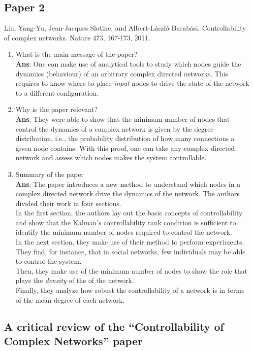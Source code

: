 \documentclass[11pt]{article}
\begin{document}
\subsection*{Paper 2}
Liu, Yang-Yu, Jean-Jacques Slotine, and Albert-László Barabási. Controllability of complex networks. Nature 473, 167-173, 2011.
\begin{enumerate}[label=(\alph*)]
	\item What is the main message of the paper? \\ \textbf{Ans}: One can make use of analytical tools to study which nodes guide the dynamics (behaviour) of an arbitrary complex directed networks. This requires to know where to place \textit{input} nodes to drive the state of the network to a different configuration. 
	\item Why is the paper relevant? \\ \textbf{Ans}: They were able to show that the minimum number of nodes that control the dynamics of a complex network is given by the degree distribution, i.e., the probability distribution of how many connections a given node contains. With this proof, one can take any complex directed network and assess which nodes makes the system controllable.
	\item Summary of the paper \\ \textbf{Ans}: The paper introduces a new method to understand which nodes in a complex directed network drive the dynamics of the network. The authors divided their work in four sections. \\ In the first section, the authors lay out the basic concepts of controllability and show that the Kalman's controllability rank condition is sufficient to identify the minimum number of nodes required to control the network.\\ In the next section, they make use of their method to perform experiments. They find, for instance, that in social networks, few individuals may be able to control the system.\\Then, they make use of the minimum number of nodes to show the role that plays the \textit{density} of the of the network.\\Finally, they analyze how robust the controllability of a network is in terms of the mean degree of each network.
\end{enumerate}

\subsection*{A critical review of the ``Controllability of Complex Networks'' paper}
\end{document}
